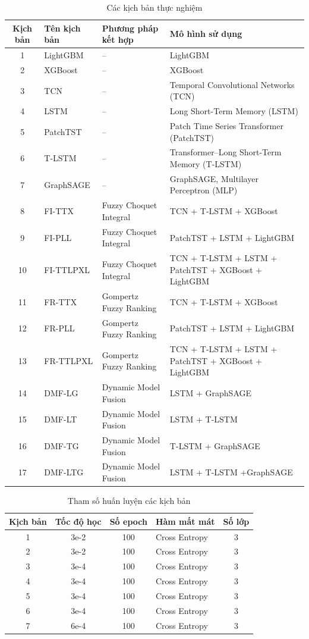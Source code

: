 \documentclass[10pt,twoside]{article}
\begin{document}
\begingroup
\centering
\begin{longtable}{c l l >{\raggedright\arraybackslash}p{6.5cm}}
\caption{Các kịch bản thực nghiệm}
\label{tab:experimental_scenarios}\\
\hline 
\textbf{Kịch bản} & \textbf{Tên kịch bản} & \textbf{Phương pháp kết hợp} & \textbf{Mô hình sử dụng} \\ \hline 
1 & LightGBM & -- & LightGBM \\ 
2 & XGBoost & -- & XGBoost \\ 
3 & TCN & -- & Temporal Convolutional Networks (TCN) \\ 
4 & LSTM & -- & Long Short-Term Memory (LSTM) \\ 
5 & PatchTST & -- & Patch Time Series Transformer (PatchTST) \\ 
6 & T-LSTM & -- & Transformer--Long Short-Term Memory (T-LSTM) \\ 
7 & GraphSAGE & -- & GraphSAGE, Multilayer Perceptron (MLP) \\ 
8 & FI-TTX & Fuzzy Choquet Integral & TCN + T-LSTM + XGBoost \\ 
9 & FI-PLL & Fuzzy Choquet Integral & PatchTST + LSTM + LightGBM \\ 
10 & FI-TTLPXL & Fuzzy Choquet Integral & TCN + T-LSTM + LSTM + PatchTST + XGBoost + LightGBM \\ 
11 & FR-TTX & Gompertz Fuzzy Ranking & TCN + T-LSTM + XGBoost \\ 
12 & FR-PLL & Gompertz Fuzzy Ranking & PatchTST + LSTM + LightGBM \\ 
13 & FR-TTLPXL & Gompertz Fuzzy Ranking & TCN + T-LSTM + LSTM + PatchTST + XGBoost + LightGBM \\ 
14 & DMF-LG & Dynamic Model Fusion & LSTM + GraphSAGE \\ 
15 & DMF-LT & Dynamic Model Fusion & LSTM + T-LSTM \\ 
16 & DMF-TG & Dynamic Model Fusion & T-LSTM + GraphSAGE \\
17 & DMF-LTG & Dynamic Model Fusion & LSTM + T-LSTM +GraphSAGE \\ \hline
\end{longtable}
\endgroup

\begin{table}[H] 
\centering 
\caption{Tham số huấn luyện các kịch bản} 
\label{tab:hyperparameter} 
\begin{tabular}{c c c l c} 
\hline 
\textbf{Kịch bản} & \textbf{Tốc độ học} & \textbf{Số epoch} & \textbf{Hàm mất mát} & \textbf{Số lớp} \\ 
\hline 
1 & 3e-2 & 100 & Cross Entropy & 3 \\ 
2 & 3e-2 & 100 & Cross Entropy & 3 \\ 
3 & 3e-4 & 100 & Cross Entropy & 3 \\ 
4 & 3e-4 & 100 & Cross Entropy & 3 \\ 
5 & 3e-4 & 100 & Cross Entropy & 3 \\ 
6 & 3e-4 & 100 & Cross Entropy & 3 \\ 
7 & 6e-4 & 100 & Cross Entropy & 3 \\ 
\hline 
\end{tabular} 
\end{table}
\end{document}
